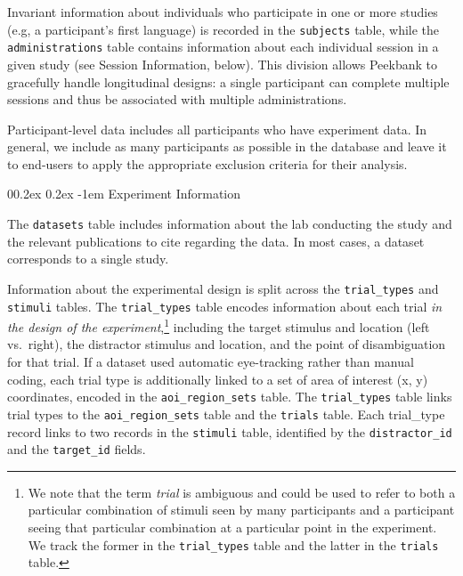 \documentclass[
  english,
  man,floatsintext]{apa6}
\makeatletter
\let\oldparagraph\paragraph
\renewcommand{\paragraph}[1]{\oldparagraph{#1}\mbox{}}
\renewcommand{\paragraph}{\@startsection{paragraph}{4}{\parindent}%
  {0\baselineskip \@plus 0.2ex \@minus 0.2ex}%
  {-1em}%
  {\normalfont\normalsize\bfseries\itshape\typesectitle}}
\makeatother
\begin{document}
Invariant information about individuals who participate in one or more studies (e.g, a participant's first language) is recorded in the \texttt{subjects} table, while the \texttt{administrations} table contains information about each individual session in a given study (see Session Information, below).
This division allows Peekbank to gracefully handle longitudinal designs: a single participant can complete multiple sessions and thus be associated with multiple administrations.

Participant-level data includes all participants who have experiment data.
In general, we include as many participants as possible in the database and leave it to end-users to apply the appropriate exclusion criteria for their analysis.

\hypertarget{experiment-information}{%
\paragraph{Experiment Information}\label{experiment-information}}

The \texttt{datasets} table includes information about the lab conducting the study and the relevant publications to cite regarding the data.
In most cases, a dataset corresponds to a single study.

Information about the experimental design is split across the \texttt{trial\_types} and \texttt{stimuli} tables.
The \texttt{trial\_types} table encodes information about each trial \textit{in the design of the experiment},\footnote{We note that the term \textit{trial} is ambiguous and could be used to refer to both a particular combination of stimuli seen by many participants and a participant seeing that particular combination at a particular point in the experiment. We track the former in the \texttt{trial\_types} table and the latter in the \texttt{trials} table.} including the target stimulus and location (left vs.~right), the distractor stimulus and location, and the point of disambiguation for that trial.
If a dataset used automatic eye-tracking rather than manual coding, each trial type is additionally linked to a set of area of interest (x, y) coordinates, encoded in the \texttt{aoi\_region\_sets} table.
The \texttt{trial\_types} table links trial types to the \texttt{aoi\_region\_sets} table and the \texttt{trials} table.
Each trial\_type record links to two records in the \texttt{stimuli} table, identified by the \texttt{distractor\_id} and the \texttt{target\_id} fields.
\end{document}
